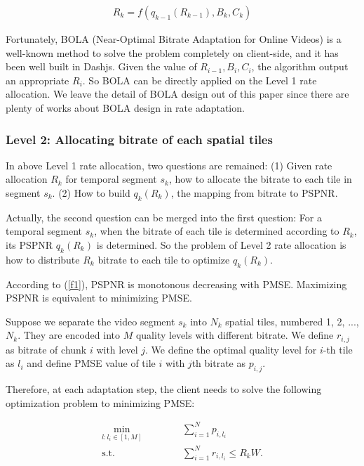 \begin{equation}
\begin{aligned}
R_k = f(q_{k-1}(R_{k-1}), B_k, C_k)
\end{aligned}
\end{equation}

Fortunately, BOLA (Near-Optimal Bitrate Adaptation for Online Videos) \cite{BOLA} is a well-known method to solve the problem completely on client-side, and it has been well built in Dashjs. Given the value of $R_{i-1}, B_i, C_i$, the algorithm output an appropriate $R_i$. So BOLA can be directly applied on the Level 1 rate allocation. We leave the detail of BOLA design out of this paper since there are plenty of works about BOLA design in rate adaptation.

\subsubsection{Level 2: Allocating bitrate of each spatial tiles}

In above Level 1 rate allocation, two questions are remained: (1) Given rate allocation $R_k$ for temporal segment $s_k$, how to allocate the bitrate to each tile in segment $s_k$. (2) How to build $q_k(R_k)$, the mapping from bitrate to PSPNR. 

Actually, the second question can be merged into the first question: For a temporal segment $s_k$, when the bitrate of each tile is determined according to $R_k$, its PSPNR $q_k(R_k)$ is determined. So the problem of Level 2 rate allocation is how to distribute $R_k$ bitrate to each tile to optimize $q_k(R_k)$.

According to (\ref{f1}), PSPNR is monotonous decreasing with PMSE. Maximizing PSPNR is equivalent to minimizing PMSE.

Suppose we separate the video segment $s_k$ into $N_k$ spatial tiles, numbered 1, 2, ..., $N_k$. They are encoded into $M$ quality levels with different bitrate. We define $r_{i, j}$ as bitrate of chunk $i$ with level $j$. We define the optimal quality level for $i$-th tile as $l_i$ and define PMSE value of tile $i$ with $j$th bitrate as $p_{i, j}$.

Therefore, at each adaptation step, the client needs to solve the following optimization problem to minimizing PMSE:

\begin{equation}
\begin{aligned}
\min_{l: l_i \in [1, M]} \text{~~~~~~} & \text{~~~~} \sum_{i = 1}^N p_{i, l_i} \\
\text{s.t.} \text{~~~~} & \text{~~~~}\sum_{i=1}^N r_{i,l_i} \le R_kW.
\end{aligned}
\end{equation}

